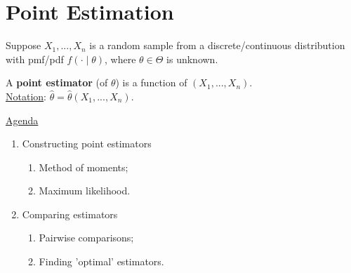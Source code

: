 \documentclass[11pt]{elegantbook}
\begin{document}
\section{Point Estimation}
Suppose $X_1,...,X_n$ is a random sample from a discrete/continuous distribution with pmf/pdf $f(\cdot\mid \theta)$, where $\theta\in\Theta$ is unknown.

\begin{definition}
    \normalfont
    A \textbf{point estimator} (of $\theta$) is a function of $(X_1,...,X_n)$.\\
    \underline{Notation}: $\hat{\theta}=\hat{\theta}(X_1,...,X_n)$.
\end{definition}

\underline{Agenda}
\begin{enumerate}[(1).]
    \item Constructing point estimators
    \begin{enumerate}[$\circ$]
        \item Method of moments;
        \item Maximum likelihood.
    \end{enumerate}
    \item Comparing estimators
    \begin{enumerate}[$\circ$]
        \item Pairwise comparisons;
        \item Finding 'optimal' estimators.
    \end{enumerate}
\end{enumerate}
\end{document}
